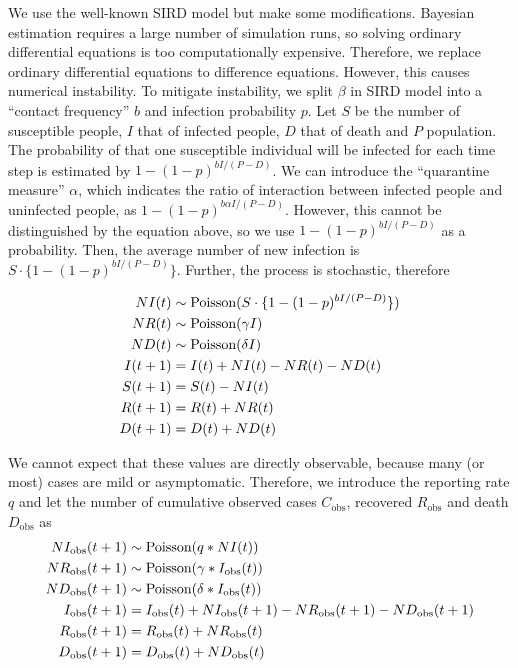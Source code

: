 \documentclass{article}
\begin{document}
We use the well-known SIRD model but make some modifications.
Bayesian estimation requires a large number of simulation runs, so solving ordinary differential equations is too computationally expensive.
Therefore, we replace ordinary differential equations to difference equations.
However, this causes numerical instability.
To mitigate instability, we split $\beta$ in SIRD model into a ``contact frequency'' $b$ and infection probability $p$.
Let $S$ be the number of susceptible people, $I$ that of infected people, $D$ that of death and $P$ population.
The probability of that one susceptible individual will be infected for each time step is estimated by $1 - (1 - p)^{b I / (P - D)}$.
We can introduce the ``quarantine measure'' $\alpha$, which indicates the ratio of interaction between infected people and uninfected people, as $1 - (1 - p)^{b \alpha I / (P - D)}$.
However, this cannot be distinguished by the equation above, so we use $1 - (1 - p)^{b I / (P - D)}$ as a probability.
Then, the average number of new infection is $S \cdot \{1 - (1 - p)^{b I / (P - D)} \}$.
Further, the process is stochastic, therefore 

\begin{align}
 NI(t) &\sim \textup{Poisson}(S \cdot \{1 - (1 - p)^{b I / (P - D)} \})\\
 NR(t) &\sim \textup{Poisson}(\gamma I)\\
 ND(t) &\sim \textup{Poisson}(\delta I)\\
 I(t+1) &= I(t) + NI(t) - NR(t) - ND(t)\\
 S(t+1) &= S(t) - NI(t)\\
 R(t+1) &= R(t) + NR(t)\\
 D(t+1) &= D(t) + ND(t)
\end{align}

We cannot expect that these values are directly observable, because many (or most) cases are mild or asymptomatic.
Therefore, we introduce the reporting rate $q$ and let the number of cumulative observed cases $C_{\text{obs}}$, recovered $R_{\text{obs}}$ and death $D_{\text{obs}}$ as
\begin{align}
 NI_{\text{obs}}(t+1) &\sim \textup{Poisson}(q * NI(t))\\
 NR_{\text{obs}}(t+1) &\sim \textup{Poisson}(\gamma * I_{\text{obs}}(t))\\
 ND_{\text{obs}}(t+1) &\sim \textup{Poisson}(\delta * I_{\text{obs}}(t))\\
 I_{\text{obs}}(t+1) &= I_{\text{obs}}(t) + NI_{\text{obs}}(t+1) - NR_{\text{obs}}(t+1) - ND_{\text{obs}}(t+1)\\
 R_{\text{obs}}(t+1) &= R_{\text{obs}}(t) + NR_{\text{obs}}(t)\\
 D_{\text{obs}}(t+1) &= D_{\text{obs}}(t) + ND_{\text{obs}}(t)
\end{align}
\end{document}
